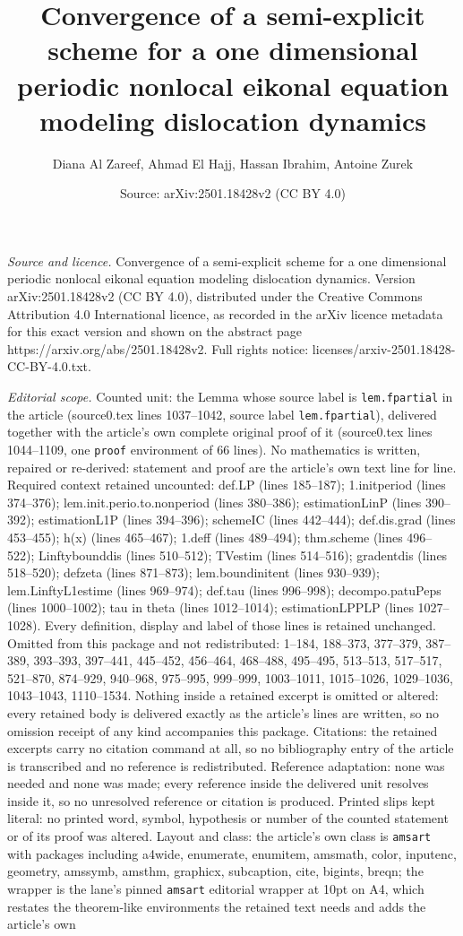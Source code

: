 \documentclass[10pt,a4paper]{amsart}
\title[Convergence of a semi-explicit scheme for a one dimensional ]{Convergence of a semi-explicit scheme for a one dimensional periodic nonlocal eikonal equation modeling dislocation dynamics}
\author{Diana Al Zareef, Ahmad El Hajj, Hassan Ibrahim, Antoine Zurek}
\date{Source: arXiv:2501.18428v2 (CC BY 4.0)}
\begin{document}
\maketitle

\noindent\emph{Source and licence.} Convergence of a semi-explicit scheme for a one dimensional periodic nonlocal eikonal equation modeling dislocation dynamics. Version arXiv:2501.18428v2 (CC BY 4.0), distributed under the Creative Commons Attribution 4.0 International licence, as recorded in the arXiv licence metadata for this exact version and shown on the abstract page https://arxiv.org/abs/2501.18428v2. Full rights notice: licenses/arxiv-2501.18428-CC-BY-4.0.txt.\par\smallskip

\noindent\textit{Editorial scope.} Counted unit: the Lemma whose source label is \texttt{lem.fpartial} in the article (source0.tex lines 1037--1042, source label \texttt{lem.fpartial}), delivered together with the article's own complete original proof of it (source0.tex lines 1044--1109, one \texttt{proof} environment of 66 lines). No mathematics is written, repaired or re-derived: statement and proof are the article's own text line for line. Required context retained uncounted: def.LP (lines 185--187); 1.initperiod (lines 374--376); lem.init.perio.to.nonperiod (lines 380--386); estimationLinP (lines 390--392); estimationL1P (lines 394--396); schemeIC (lines 442--444); def.dis.grad (lines 453--455); h(x) (lines 465--467); 1.deff (lines 489--494); thm.scheme (lines 496--522); Linftybounddis (lines 510--512); TVestim (lines 514--516); gradentdis (lines 518--520); defzeta (lines 871--873); lem.boundinitent (lines 930--939); lem.LinftyL1estime (lines 969--974); def.tau (lines 996--998); decompo.patuPeps (lines 1000--1002); tau in theta (lines 1012--1014); estimationLPPLP (lines 1027--1028). Every definition, display and label of those lines is retained unchanged. Omitted from this package and not redistributed: 1--184, 188--373, 377--379, 387--389, 393--393, 397--441, 445--452, 456--464, 468--488, 495--495, 513--513, 517--517, 521--870, 874--929, 940--968, 975--995, 999--999, 1003--1011, 1015--1026, 1029--1036, 1043--1043, 1110--1534. Nothing inside a retained excerpt is omitted or altered: every retained body is delivered exactly as the article's lines are written, so no omission receipt of any kind accompanies this package. Citations: the retained excerpts carry no citation command at all, so no bibliography entry of the article is transcribed and no reference is redistributed. Reference adaptation: none was needed and none was made; every reference inside the delivered unit resolves inside it, so no unresolved reference or citation is produced. Printed slips kept literal: no printed word, symbol, hypothesis or number of the counted statement or of its proof was altered. Layout and class: the article's own class is \texttt{amsart} with packages including a4wide, enumerate, enumitem, amsmath, color, inputenc, geometry, amssymb, amsthm, graphicx, subcaption, cite, bigints, breqn; the wrapper is the lane's pinned \texttt{amsart} editorial wrapper at 10pt on A4, which restates the theorem-like environments the retained text needs and adds the article's own 
\end{document}
